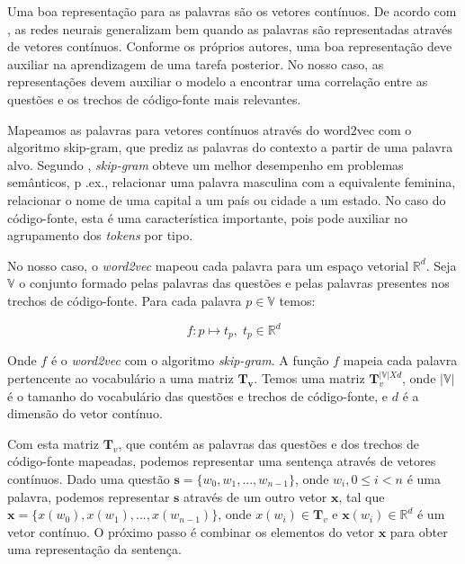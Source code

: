 Uma boa representação para as palavras são os vetores contínuos. De acordo com \cite{Goodfellow-et-al-2016}, as redes neurais generalizam bem quando as palavras são representadas através de vetores contínuos. Conforme os próprios autores, uma boa representação deve auxiliar na aprendizagem de uma tarefa posterior. No nosso caso, as representações devem auxiliar o modelo a encontrar uma correlação entre as questões e os trechos de código-fonte mais relevantes.

Mapeamos as palavras para vetores contínuos através do \gls{word2vec} com o algoritmo \gls{skip-gram}, que prediz as palavras do contexto a partir de uma palavra alvo. Segundo \cite{mikolov2013distributed}, \textit{skip-gram} obteve um melhor desempenho em problemas semânticos, p .ex., relacionar uma palavra masculina com a equivalente feminina, relacionar o nome de uma capital a um país ou cidade a um estado. No caso do código-fonte, esta é uma característica importante, pois pode auxiliar no agrupamento dos \textit{tokens} por tipo. 

No nosso caso, o \textit{word2vec} mapeou cada palavra para um espaço vetorial $\mathbb{R}^{d}$. Seja $\mathbb{V}$ o conjunto formado pelas palavras das questões e pelas palavras presentes nos trechos de código-fonte. Para cada palavra ${p} \in \mathbb{V}$ temos:

\begin{equation}
    f: {p} \mapsto t_{p},\; t_{p} \in \mathbb{R}^{d}
\end{equation}

Onde $f$ é o \textit{word2vec} com o algoritmo \textit{skip-gram}. A função $f$ mapeia cada palavra pertencente ao vocabulário a uma matriz $\bm{T_{v}}$.
Temos uma matriz $\bm{T}_{v}^{|\mathbb{V}| X d}$, onde $|\mathbb{V}|$ é o tamanho do vocabulário das questões e trechos de código-fonte, e $d$ é a dimensão do vetor contínuo.

Com esta matriz $\bm{T}_{v}$, que contém as palavras das questões e dos trechos de código-fonte mapeadas, podemos representar uma sentença através de vetores contínuos. Dado uma questão $\bm{s} = \{ w_{0}, w_{1}, . . ., w_{n - 1}\}$, onde $w_{i}, 0 \leq i < n$ é uma palavra, podemos representar $\bm{s}$ através de um outro vetor $\bm{x}$, tal que $\bm{x} = \{ x(w_{0}), x(w_{1}), . . ., x(w_{n - 1})\}$, onde $x(w_{i}) \in \bm{T}_{v}$ e $\bm{x}(w_{i}) \in \mathbb{R}^{d}$ é um vetor contínuo. O próximo passo é combinar os elementos do vetor $\bm{x}$ para obter uma representação da sentença.

